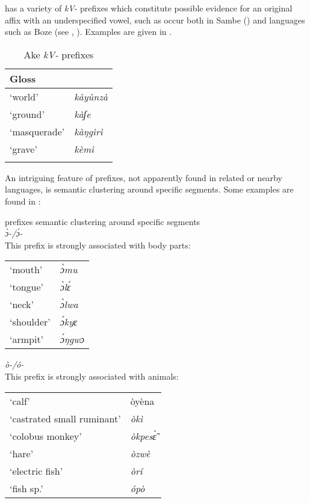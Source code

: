\documentclass[output=paper]{langsci/langscibook}
\begin{document}
\largerpage[-1]
 has a variety of \textit{kV}- prefixes which constitute possible evidence for an original affix with an underspecified vowel, such as occur both in Sambe () and  languages such as Boze (see , ). Examples are given in .

\begin{table}[t]
\caption{Ake \textit{kV-} prefixes}
\label{extab:nomaffplat:52}
\begin{tabularx}{\textwidth}{XX}
 \lsptoprule
Gloss 	&    {\ilit{Ake}}\\
\midrule
‘world’ 	&  \itshape kàyùnzà\\
‘ground’ 	&  \itshape kàʃe\\
‘masquerade’ 	&  \itshape kàŋgìrì\\
‘grave’ 	&  \itshape kèmì\\
 \lspbottomrule
\end{tabularx}
\end{table}


An intriguing feature of  prefixes, not apparently found in related or nearby  languages, is semantic clustering around specific segments. Some examples are found in :

\ea\label{ex:nomaffplat:53}
 { prefixes semantic clustering around specific segments}\\

  \ea \textit{ɔ̀-/ɔ́-}\\
  This prefix is strongly associated with body parts:\\
  \begin{tabularx}{\textwidth}{lX}
  ‘mouth’ 	&  \itshape ɔ̀mu  \\
  ‘tongue’ 	&  \itshape ɔ̀lɛ́  \\
  ‘neck’ 	&  \itshape ɔ̀lwa  \\
  ‘shoulder’ 	&  \itshape ɔ́kyɛ  \\
  ‘armpit’ 	&  \itshape ɔ́ŋgwɔ  \\  
  \end{tabularx}

\newpage   
  \ex \textit{ò-/ó-}\\
  This prefix is strongly associated with animals:\\
  \begin{tabularx}{\textwidth}{lX}
  ‘calf’ 	& òyèna\\
  ‘castrated small ruminant’ 	&  \textit{òkì} \\
  ‘colobus monkey’ 	& \textit{òkpesɛ̃̀ }\\
  ‘hare’ 	&  \itshape òzwè\\
  ‘electric fish’ 	&  \itshape òrǐ\\
  ‘fish sp.’ 	&  \itshape ópò\\
  \end{tabularx}
  
\end{document}
